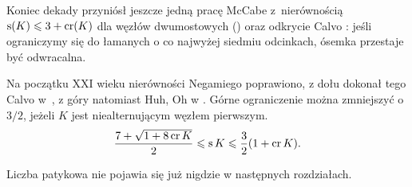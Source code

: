 Koniec dekady przyniósł jeszcze jedną pracę McCabe z~nierównością $\operatorname{s}(K) \leqslant 3 + \operatorname{cr} (K)$ dla węzłów dwumostowych (\cite{mccabe98}) oraz odkrycie Calvo \cite{calvo01}: jeśli ograniczymy się do łamanych o co najwyżej siedmiu odcinkach, ósemka przestaje być odwracalna.
%
%

Na początku XXI wieku nierówności Negamiego poprawiono, z dołu dokonał tego Calvo w~\cite{calvo01}, z góry natomiast Huh, Oh w \cite{huh11}.
%
%
%
Górne ograniczenie można zmniejszyć o $3/2$, jeżeli $K$ jest niealternującym węzłem pierwszym.
\begin{equation}
    \frac{7+\sqrt{1 + 8 \operatorname{cr} K}}{2} \leqslant \operatorname{s} K \leqslant \frac{3}{2} (1 + \operatorname{cr} K).
\end{equation}

Liczba patykowa nie pojawia się już nigdzie w następnych rozdziałach.


%



